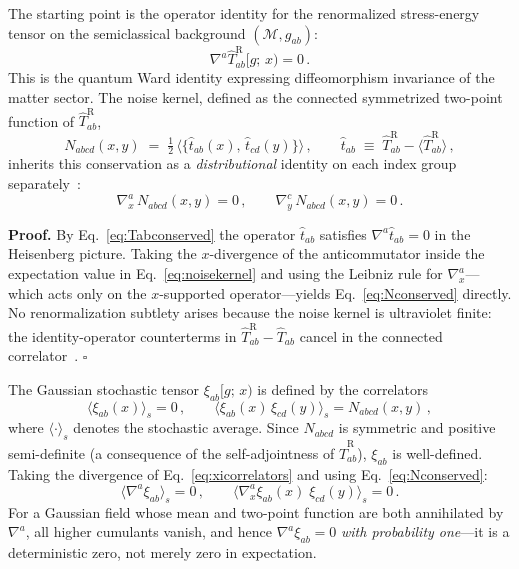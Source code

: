 \documentclass[12pt,a4paper]{article}
\begin{document}
The starting point is the operator identity for the renormalized stress-energy tensor
on the semiclassical background $({\mathcal M}, g_{ab})$:
%
\begin{equation}
  \nabla^a \hat{T}^{\mathrm{R}}_{ab}[g;\, x) = 0\,.
  \label{eq:Tabconserved}
\end{equation}
%
This is the quantum Ward identity expressing diffeomorphism invariance of the matter
sector.  The noise kernel, defined as the connected symmetrized two-point function of
$\hat{T}^{\mathrm{R}}_{ab}$,
%
\begin{equation}
  N_{abcd}(x,y)
  \;=\;
  \tfrac{1}{2}\,
  \bigl\langle
    \bigl\{\hat{t}_{ab}(x),\, \hat{t}_{cd}(y)\bigr\}
  \bigr\rangle\,,
  \qquad
  \hat{t}_{ab} \;\equiv\; \hat{T}^{\mathrm{R}}_{ab}
    - \langle \hat{T}^{\mathrm{R}}_{ab}\rangle\,,
  \label{eq:noisekernel}
\end{equation}
%
inherits this conservation as a \emph{distributional} identity on each index group
separately~\cite{HuVerdaguer2008}:
%
\begin{equation}
  \nabla^a_x\, N_{abcd}(x,y) = 0\,,
  \qquad
  \nabla^c_y\, N_{abcd}(x,y) = 0\,.
  \label{eq:Nconserved}
\end{equation}

\noindent
\textbf{Proof.}
By Eq.~\eqref{eq:Tabconserved} the operator $\hat{t}_{ab}$ satisfies
$\nabla^a \hat{t}_{ab} = 0$ in the Heisenberg picture.
Taking the $x$-divergence of the anticommutator inside the expectation
value in Eq.~\eqref{eq:noisekernel} and using the Leibniz rule for
$\nabla^a_x$---which acts only on the $x$-supported operator---yields
Eq.~\eqref{eq:Nconserved} directly.  No renormalization subtlety arises
because the noise kernel is ultraviolet finite: the identity-operator
counterterms in $\hat{T}^{\mathrm{R}}_{ab} - \hat{T}_{ab}$ cancel in the
connected correlator~\cite{PhillipsHu2001,HuVerdaguer2004}.
\hfill$\square$

\medskip

The Gaussian stochastic tensor $\xi_{ab}[g;\,x)$ is defined by the correlators
%
\begin{equation}
  \langle \xi_{ab}(x)\rangle_s = 0\,,
  \qquad
  \langle \xi_{ab}(x)\,\xi_{cd}(y)\rangle_s
  = N_{abcd}(x,y)\,,
  \label{eq:xicorrelators}
\end{equation}
%
where $\langle\cdot\rangle_s$ denotes the stochastic average.
Since $N_{abcd}$ is symmetric and positive semi-definite
(a consequence of the self-adjointness of $\hat{T}^{\mathrm{R}}_{ab}$),
$\xi_{ab}$ is well-defined.
Taking the divergence of Eq.~\eqref{eq:xicorrelators} and using
Eq.~\eqref{eq:Nconserved}:
%
\begin{equation}
  \langle \nabla^a \xi_{ab}\rangle_s = 0\,,
  \qquad
  \langle \nabla^a_x \xi_{ab}(x)\;\xi_{cd}(y)\rangle_s = 0\,.
  \label{eq:xiconserved}
\end{equation}
%
For a Gaussian field whose mean and two-point function are both annihilated by
$\nabla^a$, all higher cumulants vanish, and hence
$\nabla^a \xi_{ab} = 0$ \emph{with probability one}---it is a deterministic
zero, not merely zero in expectation.
\end{document}
